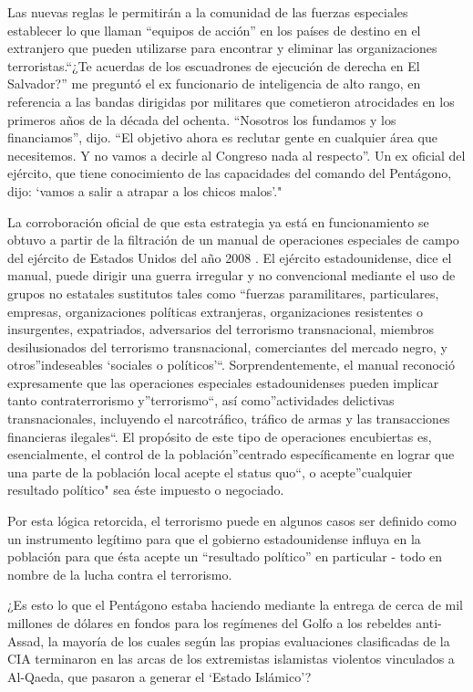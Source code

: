 \documentclass[10pt,a5paper,twoside,spanish,]{book}
\begin{document}
Las nuevas reglas le permitirán a la comunidad de las fuerzas especiales
establecer lo que llaman ``equipos de acción'' en los países de destino
en el extranjero que pueden utilizarse para encontrar y eliminar las
organizaciones terroristas.``¿Te acuerdas de los escuadrones de
ejecución de derecha en El Salvador?'' me preguntó el ex funcionario de
inteligencia de alto rango, en referencia a las bandas dirigidas por
militares que cometieron atrocidades en los primeros años de la década
del ochenta. ``Nosotros los fundamos y los financiamos'', dijo. ``El
objetivo ahora es reclutar gente en cualquier área que necesitemos. Y no
vamos a decirle al Congreso nada al respecto''. Un ex oficial del
ejército, que tiene conocimiento de las capacidades del comando del
Pentágono, dijo: `vamos a salir a atrapar a los chicos malos'."

La corroboración oficial de que esta estrategia ya está en
funcionamiento se obtuvo a partir de la filtración de un manual de
operaciones especiales de campo del ejército de Estados Unidos del año
2008 . El ejército estadounidense, dice el manual, puede dirigir una
guerra irregular y no convencional mediante el uso de grupos no
estatales sustitutos tales como ``fuerzas paramilitares, particulares,
empresas, organizaciones políticas extranjeras, organizaciones
resistentes o insurgentes, expatriados, adversarios del terrorismo
transnacional, miembros desilusionados del terrorismo transnacional,
comerciantes del mercado negro, y otros''indeseables `sociales o
políticos'``. Sorprendentemente, el manual reconoció expresamente que
las operaciones especiales estadounidenses pueden implicar tanto
contraterrorismo y''terrorismo``, así como''actividades delictivas
transnacionales, incluyendo el narcotráfico, tráfico de armas y las
transacciones financieras ilegales``. El propósito de este tipo de
operaciones encubiertas es, esencialmente, el control de la
población''centrado específicamente en lograr que una parte de la
población local acepte el status quo``, o acepte''cualquier resultado
político" sea éste impuesto o negociado.

Por esta lógica retorcida, el terrorismo puede en algunos casos ser
definido como un instrumento legítimo para que el gobierno
estadounidense influya en la población para que ésta acepte un
``resultado político'' en particular - todo en nombre de la lucha contra
el terrorismo.

¿Es esto lo que el Pentágono estaba haciendo mediante la entrega de
cerca de mil millones de dólares en fondos para los regímenes del Golfo
a los rebeldes anti-Assad, la mayoría de los cuales según las propias
evaluaciones clasificadas de la CIA terminaron en las arcas de los
extremistas islamistas violentos vinculados a Al-Qaeda, que pasaron a
generar el `Estado Islámico'?
\end{document}
